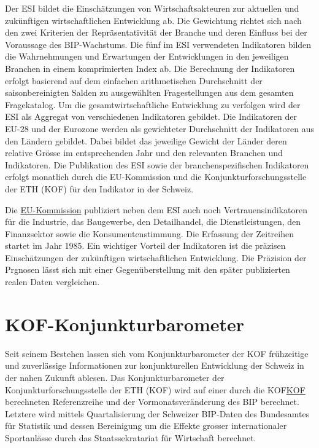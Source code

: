 \documentclass[
]{article}
\begin{document}
Der ESI bildet die Einschätzungen von Wirtschaftsakteuren zur aktuellen
und zukünftigen wirtschaftlichen Entwicklung ab. Die Gewichtung richtet
sich nach den zwei Kriterien der Repräsentativität der Branche und deren
Einfluss bei der Voraussage des BIP-Wachstums. Die fünf im ESI
verwendeten Indikatoren bilden die Wahrnehmungen und Erwartungen der
Entwicklungen in den jeweiligen Branchen in einem komprimierten Index
ab. Die Berechnung der Indikatoren erfolgt basierend auf dem einfachen
arithmetischen Durchschnitt der saisonbereinigten Salden zu ausgewählten
Fragestellungen aus dem gesamten Fragekatalog. Um die
gesamtwirtschaftliche Entwicklung zu verfolgen wird der ESI als Aggregat
von verschiedenen Indikatoren gebildet. Die Indikatoren der EU-28 und
der Eurozone werden als gewichteter Durchschnitt der Indikatoren aus den
Ländern gebildet. Dabei bildet das jeweilige Gewicht der Länder deren
relative Grösse im entsprechenden Jahr und den relevanten Branchen und
Indikatoren. Die Publikation des ESI sowie der branchenspezifischen
Indikatoren erfolgt monatlich durch die EU-Kommission und die
Konjunkturforschungsstelle der ETH (KOF) für den Indikator in der
Schweiz.

Die
\href{https://ec.europa.eu/eurostat/statistics-explained/index.php?title=Short-term_business_statistics_and_the_economic_sentiment_indicator}{EU-Kommission}
publiziert neben dem ESI auch noch Vertrauensindikatoren für die
Industrie, das Baugewerbe, den Detailhandel, die Dienstleistungen, den
Finanzsektor sowie die Konsumentenstimmung. Die Erfassung der Zeitreihen
startet im Jahr 1985. Ein wichtiger Vorteil der Indikatoren ist die
präzisen Einschätzungen der zukünftigen wirtschaftlichen Entwicklung.
Die Präzision der Prgnosen lässt sich mit einer Gegenüberstellung mit
den später publizierten realen Daten vergleichen.

\hypertarget{kof-konjunkturbarometer}{%
\section{KOF-Konjunkturbarometer}\label{kof-konjunkturbarometer}}

Seit seinem Bestehen lassen sich vom Konjunkturbarometer der KOF
frühzeitige und zuverlässige Informationen zur konjunkturellen
Entwicklung der Schweiz in der nahen Zukunft ablesen. Das
Konjunkturbarometer der Konjunkturforschungsstelle der ETH (KOF) wird
auf einer durch die
KOF\href{https://kof.ethz.ch/prognosen-indikatoren/indikatoren/kof-konjunkturbarometer.html}{KOF}
berechneten Referenzreihe und der Vormonatsveränderung des BIP
berechnet. Letztere wird mittels Quartalisierung der Schweizer BIP-Daten
des Bundesamtes für Statistik und dessen Bereinigung um die Effekte
grosser internationaler Sportanlässe durch das Staatssekratariat für
Wirtschaft berechnet.
\end{document}
